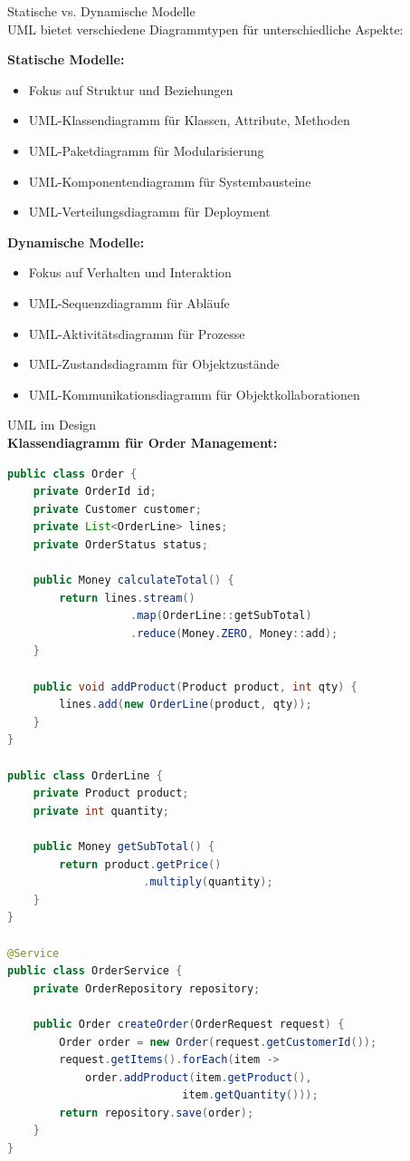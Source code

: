 \begin{concept}{Statische vs. Dynamische Modelle}\\
UML bietet verschiedene Diagrammtypen für unterschiedliche Aspekte:

\textbf{Statische Modelle:}
\begin{itemize}
    \item Fokus auf Struktur und Beziehungen
    \item UML-Klassendiagramm für Klassen, Attribute, Methoden
    \item UML-Paketdiagramm für Modularisierung
    \item UML-Komponentendiagramm für Systembausteine
    \item UML-Verteilungsdiagramm für Deployment
\end{itemize}

\textbf{Dynamische Modelle:}
\begin{itemize}
    \item Fokus auf Verhalten und Interaktion
    \item UML-Sequenzdiagramm für Abläufe
    \item UML-Aktivitätsdiagramm für Prozesse
    \item UML-Zustandsdiagramm für Objektzustände
    \item UML-Kommunikationsdiagramm für Objektkollaborationen
\end{itemize}
\end{concept}

\begin{example2}{UML im Design}\\
\textbf{Klassendiagramm für Order Management:}

\begin{lstlisting}[language=Java, style=basesmol]
public class Order {
    private OrderId id;
    private Customer customer;
    private List<OrderLine> lines;
    private OrderStatus status;
    
    public Money calculateTotal() {
        return lines.stream()
                   .map(OrderLine::getSubTotal)
                   .reduce(Money.ZERO, Money::add);
    }
    
    public void addProduct(Product product, int qty) {
        lines.add(new OrderLine(product, qty));
    }
}

public class OrderLine {
    private Product product;
    private int quantity;
    
    public Money getSubTotal() {
        return product.getPrice()
                     .multiply(quantity);
    }
}

@Service
public class OrderService {
    private OrderRepository repository;
    
    public Order createOrder(OrderRequest request) {
        Order order = new Order(request.getCustomerId());
        request.getItems().forEach(item -> 
            order.addProduct(item.getProduct(), 
                           item.getQuantity()));
        return repository.save(order);
    }
}
\end{lstlisting}
\end{example2}

